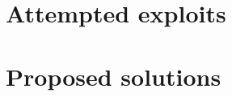 \documentclass{tudelft-report}
\begin{document}
\chapter{Attempted exploits}\label{cha:3}






\chapter{Proposed solutions}\label{cha:4}






\appendix

%

\printbibliography
\end{document}
